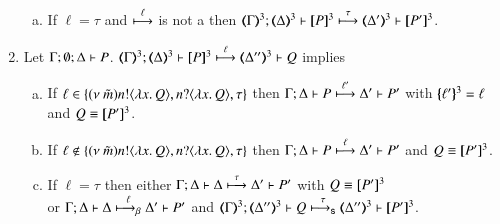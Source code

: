 \begin{proposition}
\begin{enumerate}
\begin{enumerate}[a)]
				\item	If $\ell = \tau$ and $\stackrel{\ell}{\longmapsto}$ is not a \betatran then
					$\horel{\tmap{\Gamma}{3}}{\tmap{\Delta}{3}}{\pmap{P}{3}}{\hby{\tau}}
					{\tmap{\Delta'}{3}}{\pmap{P'}{3}}$.
			\end{enumerate}

		\item	Let $\Gamma; \emptyset; \Delta \vdash P$.
			$\horel{\tmap{\Gamma}{3}}{\tmap{\Delta}{3}}{\pmap{P}{3}}{\hby{\ell}}
			{\tmap{\Delta''}{3}}{Q}$ implies
%
			\begin{enumerate}[a)]
				\item	If $\ell \in \{(\nu\ \tilde{m}) n ! \langle \lambda x.\,Q \rangle, n ? \langle \lambda x.\,Q \rangle, \tau\}$
					then
					$\Gamma; \Delta \vdash P \stackrel{\ell'}{\longmapsto} \Delta' \vdash P'$
					with $\{\!\!\{\ell'\}\!\!\}^{3} = \ell$ and $Q \equiv [\!\![P']\!\!]^{3}$.

				\item	If $\ell \notin \{(\nu\ \tilde{m}) n ! \langle \lambda x.\,Q \rangle, n ? \langle \lambda x.\,Q \rangle, \tau\}$
					then
					$\Gamma; \Delta \vdash P \stackrel{\ell}{\longmapsto} \Delta' \vdash P'$ and $Q \equiv [\!\![P']\!\!]^{3}$.

				\item	If $\ell = \tau$ then
					either
					$\Gamma; \Delta \vdash \Delta \stackrel{\tau}{\longmapsto} \Delta' \vdash P'$ with $Q \equiv [\!\![P']\!\!]^{3}$\\
					or
					$\Gamma; \Delta \vdash \Delta \stackrel{\ell}{\longmapsto_{\mathsf{\beta}}} \Delta' \vdash P'$ and
					$\horel{\tmap{\Gamma}{3}}{\tmap{\Delta''}{3}}{Q}{\shby{\tau}}
					{\tmap{\Delta''}{3}}{\pmap{P'}{3}}$.
			\end{enumerate}
	\end{enumerate}
\end{proposition}


